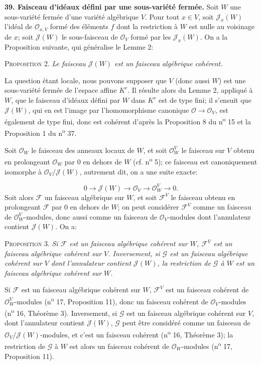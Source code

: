 \textbf{39. Faisceau d'idéaux défini par une sous-variété fermée.} Soit $W$ une sous-variété fermée d'une variété algébrique $V$. Pour tout $x \in V$, soit $\mathcal{J}_x(W)$ l'idéal de $\mathcal{O}_{x,V}$ formé des éléments $f$ dont la restriction à $W$ est nulle au voisinage de $x$; soit $\mathcal{J}(W)$ le sous-faisceau de $\mathcal{O}_V$ formé par les $\mathcal{J}_x(W)$. On a la Proposition suivante, qui généralise le Lemme 2:

\textsc{Proposition} 2. \textit{Le faisceau $\mathcal{J}(W)$ est un faisceau algébrique cohérent.}

La question étant locale, nous pouvons supposer que $V$ (donc aussi $W$) est une sous-variété fermée de l'espace affine $K^r$. Il résulte alors du Lemme 2, appliqué à $W$, que le faisceau d'idéaux défini par $W$ dans $K^r$ est de type fini; il s'ensuit que $\mathcal{J}(W)$, qui en est l'image par l'homomorphisme canonique $\mathcal{O} \to \mathcal{O}_V$, est également de type fini, donc est cohérent d'après la Proposition 8 du n\textsuperscript{o} 15 et la Proposition 1 du n\textsuperscript{o} 37.



Soit $\mathcal{O}_W$ le faisceau des anneaux locaux de $W$, et soit $\mathcal{O}_W^V$ le faisceau sur $V$ obtenu en prolongeant $\mathcal{O}_W$ par 0 en dehors de $W$ (cf. n\textsuperscript{o} 5); ce faisceau est canoniquement isomorphe à $\mathcal{O}_V/\mathcal{J}(W)$, autrement dit, on a une suite exacte:

\begin{equation*}
0 \to \mathcal{J}(W) \to \mathcal{O}_V \to \mathcal{O}_W^V \to 0.
\end{equation*}
Soit alors $\mathcal{F}$ un faisceau algébrique sur $W$, et soit $\mathcal{F}^V$ le faisceau obtenu en prolongeant $\mathcal{F}$ par 0 en dehors de $W$; on peut considérer $\mathcal{F}^V$ comme un faisceau de $\mathcal{O}_W^V$-modules, donc aussi comme un faisceau de $\mathcal{O}_V$-modules dont l'annulateur contient $\mathcal{J}(W)$. On a:

\textsc{Proposition} 3. \textit{Si $\mathcal{F}$ est un faisceau algébrique cohérent sur $W$, $\mathcal{F}^V$ est un faisceau algébrique cohérent sur $V$. Inversement, si $\mathcal{G}$ est un faisceau algébrique cohérent sur $V$ dont l'annulateur contient $\mathcal{J}(W)$, la restriction de $\mathcal{G}$ à $W$ est un faisceau algébrique cohérent sur $W$.}

Si $\mathcal{F}$ est un faisceau algébrique cohérent sur $W$, $\mathcal{F}^V$ est un faisceau cohérent de $\mathcal{O}_W^V$-modules (n\textsuperscript{o} 17, Proposition 11), donc un faisceau cohérent de $\mathcal{O}_V$-modules (n\textsuperscript{o} 16, Théorème 3). Inversement, si $\mathcal{G}$ est un faisceau algébrique cohérent sur $V$, dont l'annulateur contient $\mathcal{J}(W)$, $\mathcal{G}$ peut être considéré comme un faisceau de $\mathcal{O}_V/\mathcal{J}(W)$-modules, et c'est un faisceau cohérent (n\textsuperscript{o} 16, Théorème 3); la restriction de $\mathcal{G}$ à $W$ est alors un faisceau cohérent de $\mathcal{O}_W$-modules (n\textsuperscript{o} 17, Proposition 11).

